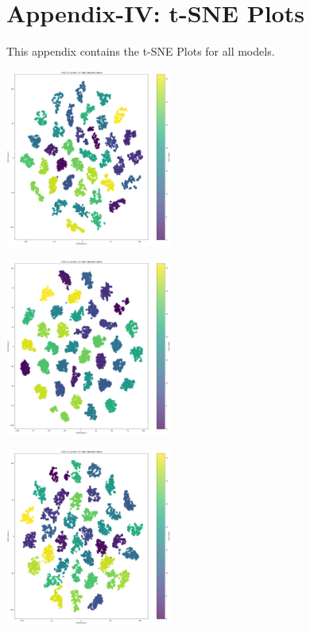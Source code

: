 \chapter*{Appendix-IV: t-SNE Plots}

\noindent This appendix contains the t-SNE Plots for all models.

\begin{multicols}{2}
\centering

\setcounter{figure}{0} %
\renewcommand{\thefigure}{2.\arabic{figure}} %

\includegraphics[width=0.41\textwidth]{Assets/tSNE/vgg19.png}

\vspace{0.5cm}

\includegraphics[width=0.41\textwidth]{Assets/tSNE/CONVNEXTBASE.png}

\vspace{0.5cm}

\includegraphics[width=0.41\textwidth]{Assets/tSNE/DenseNET121.png}


\end{multicols}
